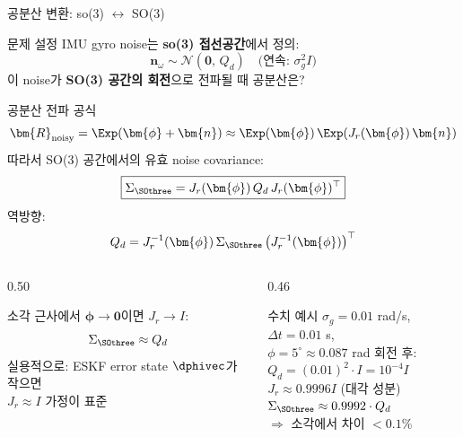 \begin{frame}[shrink=8]{공분산 변환: so(3) $\leftrightarrow$ SO(3)}
  \begin{block}{문제 설정}
    IMU gyro noise는 \textbf{so(3) 접선공간}에서 정의:
    \[
      \bm{n}_\omega \sim \mathcal{N}(\bm{0},\, Q_d) \quad \text{(연속: } \sigma_g^2 I\text{)}
    \]
    이 noise가 \textbf{SO(3) 공간의 회전}으로 전파될 때 공분산은?
  \end{block}
  \pause
  \begin{alertblock}{공분산 전파 공식}
    \[
      \bm{R}_{\text{noisy}} = \Exp(\bm{\phi} + \bm{n}) \approx \Exp(\bm{\phi})\,\Exp(J_r(\bm{\phi})\,\bm{n})
    \]
    따라서 SO(3) 공간에서의 유효 noise covariance:
    \[
      \boxed{\Sigma_{\SOthree} = J_r(\bm{\phi})\,Q_d\,J_r(\bm{\phi})^\top}
    \]
    역방향:
    \[
      Q_d = J_r^{-1}(\bm{\phi})\,\Sigma_{\SOthree}\,\bigl(J_r^{-1}(\bm{\phi})\bigr)^\top
    \]
  \end{alertblock}
  \pause
  \begin{columns}[T]
    \begin{column}{0.50\textwidth}
      \begin{block}{소각 근사에서}
        $\bm{\phi} \to \bm{0}$이면 $J_r \to I$:\\
        \[
          \Sigma_{\SOthree} \approx Q_d
        \]
        실용적으로: ESKF error state $\dphivec$가 작으면\\
        $J_r \approx I$ 가정이 표준
      \end{block}
    \end{column}
    \begin{column}{0.46\textwidth}
      \begin{exampleblock}{수치 예시}
        $\sigma_g = 0.01$ rad/s, $\Delta t = 0.01$ s,\\
        $\phi = 5^\circ \approx 0.087$ rad 회전 후:\\
        \medskip
        $Q_d = (0.01)^2 \cdot I = 10^{-4}I$\\
        $J_r \approx 0.9996 I$ (대각 성분)\\
        $\Sigma_{\SOthree} \approx 0.9992 \cdot Q_d$\\
        \medskip
        $\Rightarrow$ 소각에서 차이 $< 0.1\%$
      \end{exampleblock}
    \end{column}
  \end{columns}
\end{frame}


